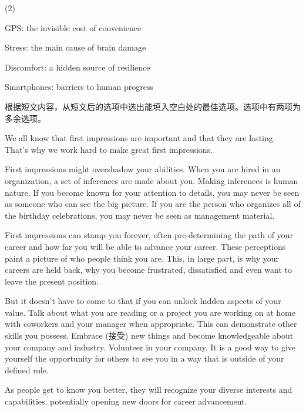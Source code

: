 \documentclass{英语试卷}
\begin{document}
\begin{choices}(2)
  \item GPS: the invisible cost of convenience
  \item Stress: the main cause of brain damage
  \item Discomfort: a hidden source of resilience
  \item Smartphones: barriers to human progress
\end{choices}
\par 根据短文内容，从短文后的选项中选出能填入空白处的最佳选项。选项中有两项为多余选项。\par
\par We all know that first impressions are important and that they are lasting. That's why we work hard to make great first impressions. \par
\par First impressions might overshadow your abilities. When you are hired in an organization, a set of inferences are made about you. Making inferences is human nature. If you become known for your attention to details, you may never be seen as someone who can see the big picture. If you are the person who organizes all of the birthday celebrations, you may never be seen as management material. \par
\par First impressions can stamp you forever, often pre-determining the path of your career and how far you will be able to advance your career. These perceptions paint a picture of who people think you are.  This, in large part, is why your careers are held back, why you become frustrated, dissatisfied and even want to leave the present position.\par
\par But it doesn't have to come to that if you can unlock hidden aspects of your value. Talk about what you are reading or a project you are working on at home with coworkers and your manager when appropriate. This can demonstrate other skills you possess. Embrace (接受) new things and become knowledgeable about your company and industry.  Volunteer in your company. It is a good way to give yourself the opportunity for others to see you in a way that is outside of your defined role.\par
\par {} As people get to know you better, they will recognize your diverse interests and capabilities, potentially opening new doors for career advancement.\par
\end{document}
